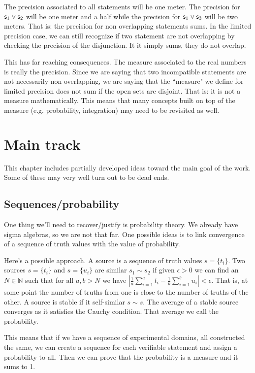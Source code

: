 \documentclass[11pt,letterpaper,fleqn]{memoir} %
\begin{document}
The precision associated to all statements will be one meter. The precision for $\mathsf{s}_1\vee\mathsf{s}_2$ will be one meter and a half while the precision for $\mathsf{s}_1\vee\mathsf{s}_3$ will be two meters. That is: the precision for non overlapping statements sums. In the limited precision case, we can still recognize if two statement are not overlapping by checking the precision of the disjunction. It it simply sums, they do not overlap.

This has far reaching consequences. The measure associated to the real numbers is really the precision. Since we are saying that two incompatible statements are not necessarily non overlapping, we are saying that the ``measure" we define for limited precision does not sum if the open sets are disjoint. That is: it is not a measure mathematically. This means that many concepts built on top of the measure (e.g. probability, integration) may need to be revisited as well.

\section{Main track}

This chapter includes partially developed ideas toward the main goal of the work. Some of these may very well turn out to be dead ends.

\subsection{Sequences/probability}

One thing we'll need to recover/justify is probability theory. We already have sigma algebras, so we are not that far. One possible ideas is to link convergence of a sequence of truth values with the value of probability.

Here's a possible approach. A source is a sequence of truth values $s=\{t_i\}$. Two sources $s=\{t_i\}$ and $s=\{u_i\}$ are similar $s_1 \sim s_2$ if given $\epsilon > 0$ we can find an $N \in \mathbb{N}$ such that for all $a,b>N$ we have $\left| \frac{1}{a} \sum\limits_{i=1}^a t_i - \frac{1}{b} \sum\limits_{i=1}^b u_i \right| < \epsilon$. That is, at some point the number of truths from one is close to the number of truths of the other. A source is stable if it self-similar $s \sim s$. The average of a stable source converges as it satisfies the Cauchy condition. That average we call the probability.

This means that if we have a sequence of experimental domains, all constructed the same, we can create a sequence for each verifiable statement and assign a probability to all. Then we can prove that the probability is a measure and it sums to 1.
\end{document}
